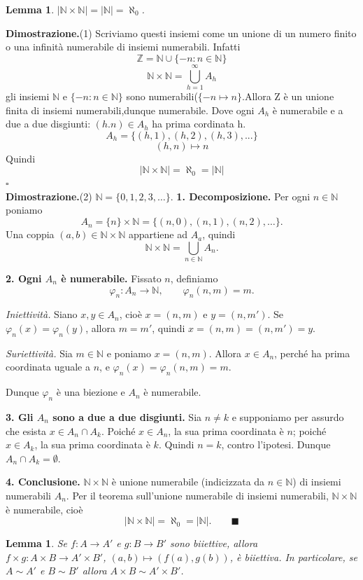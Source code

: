 \documentclass[11pt,a4paper]{article}
\newcommand{\N}{\mathbb{N}}
\newcommand{\Z}{\mathbb{Z}}
\theoremstyle{definition}
\theoremstyle{plain}
\newtheorem{lemma}[definizione]{Lemma}
\theoremstyle{remark}
\begin{document}
\begin{lemma}\label{lem:NN}
$|\N\times\N|=|\N|=\aleph_0$.
\end{lemma}

\textbf{Dimostrazione.}(1) 
Scriviamo questi insiemi come un unione di un numero finito o una infinità numerabile di insiemi numerabili. Infatti
\[
\Z =\N \cup\{-n:n\in \N\}
\]
\[\N\times\N =\bigcup_{h=1}^{\infty}A_h
\]
gli insiemi $\N$ e $\{-n:n\in \N\}$ sono numerabili($\{-n\mapsto n\}$.Allora Z è un unione finita di insiemi numerabili,dunque numerabile. Dove ogni $A_h$ è numerabile e a due a due disgiunti: $(h.n)\in A_h$ ha prima cordinata h.
\[
A_h=\{(h,1),(h,2),(h,3),...\}
\]\[(h,n)\mapsto n
\]
Quindi\[|\N\times \N|=\aleph_0=|\N|\]
\hfill$\square$\\
\textbf{Dimostrazione.}(2) 
\medskip
\noindent $\mathbb{N}=\{0,1,2,3,\dots\}$.
\smallskip
\noindent\textbf{1. Decomposizione.} Per ogni $n\in\mathbb{N}$ poniamo
\[
A_n=\{n\}\times\mathbb{N}=\{(n,0),(n,1),(n,2),\dots\}.
\]
Una coppia $(a,b)\in\mathbb{N}\times\mathbb{N}$ appartiene ad $A_a$, quindi
\[
\mathbb{N}\times\mathbb{N}=\bigcup_{n\in\mathbb{N}}A_n .
\]

\noindent\textbf{2. Ogni $A_n$ \`e numerabile.} Fissato $n$, definiamo
\[
\varphi_n:A_n\to\mathbb{N},\qquad \varphi_n(n,m)=m .
\]

\emph{Iniettivit\`a.} Siano $x,y\in A_n$, cio\`e $x=(n,m)$ e $y=(n,m')$.
Se $\varphi_n(x)=\varphi_n(y)$, allora $m=m'$, quindi $x=(n,m)=(n,m')=y$.

\emph{Suriettivit\`a.} Sia $m\in\mathbb{N}$ e poniamo $x=(n,m)$. Allora
$x\in A_n$, perch\'e ha prima coordinata uguale a $n$, e
$\varphi_n(x)=\varphi_n(n,m)=m$.

Dunque $\varphi_n$ \`e una biezione e $A_n$ \`e numerabile.

\medskip
\noindent\textbf{3. Gli $A_n$ sono a due a due disgiunti.} Sia $n\neq k$ e
supponiamo per assurdo che esista $x\in A_n\cap A_k$. Poich\'e $x\in A_n$,
la sua prima coordinata \`e $n$; poich\'e $x\in A_k$, la sua prima coordinata
\`e $k$. Quindi $n=k$, contro l'ipotesi. Dunque $A_n\cap A_k=\emptyset$.

\medskip
\noindent\textbf{4. Conclusione.} $\mathbb{N}\times\mathbb{N}$ \`e unione
numerabile (indicizzata da $n\in\mathbb{N}$) di insiemi numerabili $A_n$.
Per il teorema sull'unione numerabile di insiemi numerabili,
$\mathbb{N}\times\mathbb{N}$ \`e numerabile, cio\`e
\[
|\mathbb{N}\times\mathbb{N}|=\aleph_0=|\mathbb{N}| .
\qquad\blacksquare
\]


\begin{lemma}\label{lem:prodbij}
Se $f\colon A\to A'$ e $g\colon B\to B'$ sono biiettive, allora $f\times g\colon A\times B\to A'\times B'$, $(a,b)\mapsto(f(a),g(b))$, è biiettiva. In particolare, se $A\sim A'$ e $B\sim B'$ allora $A\times B\sim A'\times B'$.
\end{lemma}
\end{document}
